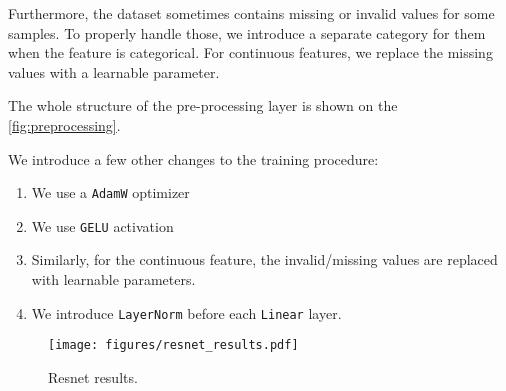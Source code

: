 Furthermore, the dataset sometimes contains missing or invalid values for some samples. To properly handle those, we
introduce a separate category for them when the feature is categorical. For continuous features, we replace the missing
values with a learnable parameter.

The whole structure of the pre-processing layer is shown on the \autoref{fig:preprocessing}.

We introduce a few other changes to the training procedure:

\begin{enumerate}
    \item We use a \verb|AdamW| optimizer \cite{adamw}
    \item We use \verb|GELU| activation \cite{gelu}
    \item Similarly, for the continuous feature, the invalid/missing values are replaced with learnable parameters.
    \item We introduce \verb|LayerNorm| \cite{layernorm} before each \verb|Linear| layer.
\end{enumerate}

\begin{figure}[htbp]
    \centering
    \texttt{[image: figures/resnet\_results.pdf]}
    \caption{Resnet results.}
    \label{fig:resnet_results}
\end{figure}


